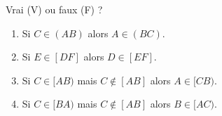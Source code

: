 \begin{exercice} %
    Vrai (V) ou faux (F) ?
    \begin{enumerate}
       \item Si $C \in (AB)$ alors $A \in (BC)$.
       \item Si $E \in [DF]$ alors $D \in [EF]$.
       \item Si $C \in [AB)$ mais $C \notin [AB]$ alors $A \in [CB)$.
       \item Si $C \in [BA)$ mais $C \notin [AB]$ alors $B \in [AC)$.
    \end{enumerate}
 \end{exercice}